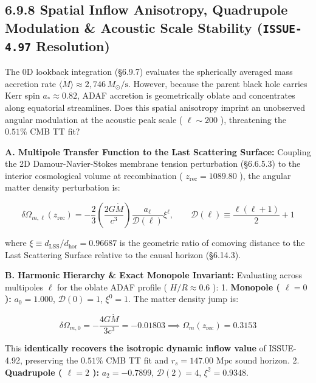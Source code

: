 \documentclass[11pt,a4paper]{article}
\theoremstyle{definition}
\theoremstyle{remark}
\begin{document}
\subsection{6.9.8 Spatial Inflow Anisotropy, Quadrupole Modulation \& Acoustic Scale Stability (\texttt{ISSUE-4.97} Resolution)}

The 0D lookback integration (\S 6.9.7) evaluates the spherically averaged mass accretion rate $\langle\dot{M}\rangle \approx 2{,}746\,M_\odot/\text{s}$. However, because the parent black hole carries Kerr spin $a_* \approx 0.82$, ADAF accretion is geometrically oblate and concentrates along equatorial streamlines. Does this spatial anisotropy imprint an unobserved angular modulation at the acoustic peak scale ( $\ell \sim 200$ ), threatening the $0.51\%$ CMB TT fit?

\textbf{A. Multipole Transfer Function to the Last Scattering Surface:}
Coupling the 2D Damour-Navier-Stokes membrane tension perturbation (\S 6.6.5.3) to the interior cosmological volume at recombination ( $z_{\text{rec}} = 1089.80$ ), the angular matter density perturbation is:


\begin{equation}
\delta\Omega_{m, \ell}(z_{\text{rec}}) = -\frac{2}{3} \left( \frac{2 G \dot{M}}{c^3} \right) \frac{a_\ell}{\mathcal{D}(\ell)} \xi^\ell, \qquad \mathcal{D}(\ell) \equiv \frac{\ell(\ell + 1)}{2} + 1
\end{equation}


where $\xi \equiv d_{\text{LSS}} / d_{\text{hor}} = 0.96687$ is the geometric ratio of comoving distance to the Last Scattering Surface relative to the causal horizon (\S 6.14.3).

\textbf{B. Harmonic Hierarchy \& Exact Monopole Invariant:}
Evaluating across multipoles $\ell$ for the oblate ADAF profile ( $H/R \approx 0.6$ ):
1. \textbf{Monopole ( $\ell = 0$ ):} $a_0 = 1.000$, $\mathcal{D}(0) = 1$, $\xi^0 = 1$. The matter density jump is:


\begin{equation}
\delta\Omega_{m, 0} = -\frac{4 G \dot{M}}{3 c^3} = -0.01803 \implies \Omega_m(z_{\text{rec}}) = 0.3153
\end{equation}


This \textbf{identically recovers the isotropic dynamic inflow value} of ISSUE-4.92, preserving the $0.51\%$ CMB TT fit and $r_s = 147.00\text{ Mpc}$ sound horizon.
2. \textbf{Quadrupole ( $\ell = 2$ ):} $a_2 = -0.7899$, $\mathcal{D}(2) = 4$, $\xi^2 = 0.9348$.
\end{document}
